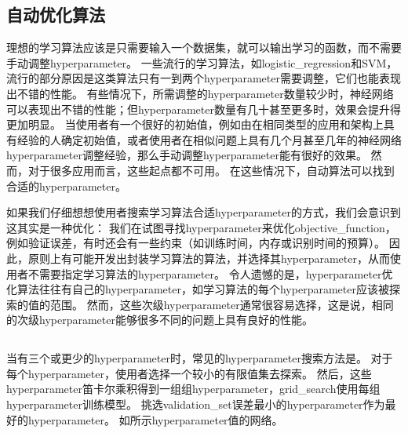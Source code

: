 \subsection{自动优化算法}
\label{sec:automatic_hyperparameter_optimization_algorithms}
理想的学习算法应该是只需要输入一个数据集，就可以输出学习的函数，而不需要手动调整\gls{hyperparameter}。
一些流行的学习算法，如\gls{logistic_regression}和\gls{SVM}，流行的部分原因是这类算法只有一到两个\gls{hyperparameter}需要调整，它们也能表现出不错的性能。
有些情况下，所需调整的\gls{hyperparameter}数量较少时，神经网络可以表现出不错的性能；但\gls{hyperparameter}数量有几十甚至更多时，效果会提升得更加明显。
当使用者有一个很好的初始值，例如由在相同类型的应用和架构上具有经验的人确定初始值，或者使用者在相似问题上具有几个月甚至几年的神经网络\gls{hyperparameter}调整经验，那么手动调整\gls{hyperparameter}能有很好的效果。%
然而，对于很多应用而言，这些起点都不可用。
在这些情况下，自动算法可以找到合适的\gls{hyperparameter}。


如果我们仔细想想使用者搜索学习算法合适\gls{hyperparameter}的方式，我们会意识到这其实是一种优化：
我们在试图寻找\gls{hyperparameter}来优化\gls{objective_function}，例如验证误差，有时还会有一些约束（如训练时间，内存或识别时间的预算）。
因此，原则上有可能开发出封装学习算法的算法，并选择其\gls{hyperparameter}，从而使用者不需要指定学习算法的\gls{hyperparameter}。
令人遗憾的是，\gls{hyperparameter}优化算法往往有自己的\gls{hyperparameter}，如学习算法的每个\gls{hyperparameter}应该被探索的值的范围。
然而，这些次级\gls{hyperparameter}通常很容易选择，这是说，相同的次级\gls{hyperparameter}能够很多不同的问题上具有良好的性能。


\subsection{}
\label{sec:grid_search}
当有三个或更少的\gls{hyperparameter}时，常见的\gls{hyperparameter}搜索方法是。
对于每个\gls{hyperparameter}，使用者选择一个较小的有限值集去探索。
然后，这些\gls{hyperparameter}笛卡尔乘积得到一组组\gls{hyperparameter}，\gls{grid_search}使用每组\gls{hyperparameter}训练模型。
挑选\gls{validation_set}误差最小的\gls{hyperparameter}作为最好的\gls{hyperparameter}。
如所示\gls{hyperparameter}值的网络。


